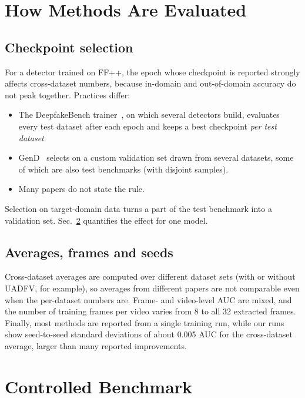 \documentclass[fonts]{icst}
\begin{document}
\section{How Methods Are Evaluated}
\label{sec:eval}

\subsection{Checkpoint selection}
For a detector trained on FF++, the epoch whose checkpoint is reported strongly affects cross-dataset numbers, because in-domain and out-of-domain accuracy do not peak together. Practices differ:
\begin{itemize}[leftmargin=*, topsep=2pt, itemsep=2pt, label=--]
    \item The DeepfakeBench trainer~\cite{yan2023deepfakebench}, on which several detectors build, evaluates every test dataset after each epoch and keeps a best checkpoint \emph{per test dataset}.
    \item GenD~\cite{yermakov2025gend} selects on a custom validation set drawn from several datasets, some of which are also test benchmarks (with disjoint samples).
    \item Many papers do not state the rule.
\end{itemize}
Selection on target-domain data turns a part of the test benchmark into a validation set. Sec.~\ref{sec:bench} quantifies the effect for one model.

\subsection{Averages, frames and seeds}
Cross-dataset averages are computed over different dataset sets (with or without UADFV, for example), so averages from different papers are not comparable even when the per-dataset numbers are. Frame- and video-level AUC are mixed, and the number of training frames per video varies from 8 to all 32 extracted frames. Finally, most methods are reported from a single training run, while our runs show seed-to-seed standard deviations of about 0.005 AUC for the cross-dataset average, larger than many reported improvements.

\section{Controlled Benchmark}
\label{sec:bench}
\end{document}
